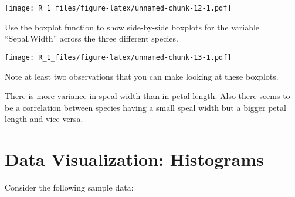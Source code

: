 \documentclass[
]{article}
\newenvironment{Shaded}{\begin{snugshade}}{\end{snugshade}}
\newcommand{\AttributeTok}[1]{\textcolor[rgb]{0.13,0.29,0.53}{#1}}
\newcommand{\FunctionTok}[1]{\textcolor[rgb]{0.13,0.29,0.53}{\textbf{#1}}}
\newcommand{\NormalTok}[1]{#1}
\newcommand{\SpecialCharTok}[1]{\textcolor[rgb]{0.81,0.36,0.00}{\textbf{#1}}}
\newcommand{\StringTok}[1]{\textcolor[rgb]{0.31,0.60,0.02}{#1}}
\begin{document}
\begin{Shaded}
\end{Shaded}

\texttt{[image: R\_1\_files/figure-latex/unnamed-chunk-12-1.pdf]}

Use the boxplot function to show side-by-side boxplots for the variable
``Sepal.Width'' across the three different species.

\begin{Shaded}
\end{Shaded}

\texttt{[image: R\_1\_files/figure-latex/unnamed-chunk-13-1.pdf]}

Note at least two observations that you can make looking at these
boxplots.

There is more variance in speal width than in petal length. Also there
seems to be a correlation between species having a small speal width but
a bigger petal length and vice versa.

\hypertarget{data-visualization-histograms}{%
\section{Data Visualization:
Histograms}\label{data-visualization-histograms}}

Consider the following sample data:
\end{document}
